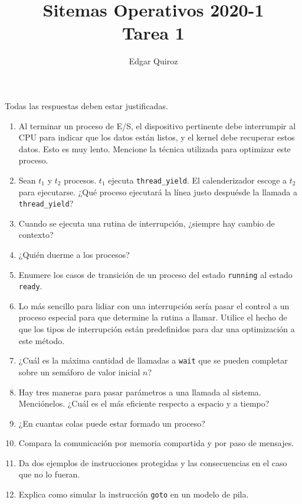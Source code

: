 \documentclass{article}
\title{
    Sitemas Operativos 2020-1\\
    Tarea 1
}
\author{
    Edgar Quiroz
}
\begin{document}
    \maketitle

    Todas las respuestas deben estar justificadas.

    \begin{enumerate}
        \item Al terminar un proceso de E/S, el dispositivo pertinente debe 
        interrumpir al CPU para indicar que los datos están listos, y el kernel
        debe recuperar estos datos. Esto es muy lento. Mencione la técnica 
        utilizada para optimizar este proceso.

        \item Sean $t_1$ y $t_2$ procesos. $t_1$ ejecuta \texttt{thread\_yield}.
        El calenderizador escoge a $t_2$ para ejecutarse. ¿Qué proceso ejecutará 
        la línea justo despuésde la llamada a \texttt{thread\_yield}?

        \item Cuando se ejecuta una rutina de interrupción, ¿siempre hay cambio
        de contexto?

        \item ¿Quién duerme a los procesos?

        \item Enumere los casos de transición de un proceso del estado 
        \texttt{running} al estado \texttt{ready}.

        \item Lo más sencillo para lidiar con una interrupción sería pasar el 
        control a un proceso especial para que determine la rutina a llamar.
        Utilice el hecho de que los tipos de interrupción están predefinidos 
        para dar una optimización a este método.

        \item ¿Cuál es la máxima cantidad de llamadas a \texttt{wait} que se 
        pueden completar sobre un semáforo de valor inicial $n$?

        \item Hay tres maneras para pasar parámetros a una llamada al sistema.
        Menciónelos. ¿Cuál es el más eficiente respecto a espacio y a tiempo?

        \item ¿En cuantas colas puede estar formado un proceso?

        \item Compara la comunicación por memoria compartida y por paso de 
        mensajes.

        \item Da dos ejemplos de instrucciones protegidas y las consecuencias en
        el caso que no lo fueran.

        \item Explica como simular la instrucción \texttt{goto} en un modelo de 
        pila.
    \end{enumerate}
\end{document}
